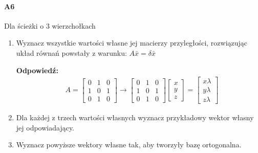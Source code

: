 \paragraph{A6} Dla ścieżki o $3$ wierzchołkach
\begin{enumerate}[label=\alph*)]
\item Wyznacz wszystkie wartości własne jej macierzy przyległości, rozwiązując układ równań powstały z warunku: $A\bar{x}=\delta \bar{x}$

\textbf{Odpowiedź: }\begin{align*}
& A=\begin{bmatrix}
0&1&0\\1&0&1\\0&1&0
\end{bmatrix}\rightarrow \begin{bmatrix}
0&1&0\\1&0&1\\0&1&0
\end{bmatrix} \begin{bmatrix}
x\\y\\z
\end{bmatrix} = \begin{bmatrix}
x\lambda \\y\lambda \\z\lambda 
\end{bmatrix}
\end{align*}

\item Dla każdej z trzech wartości własnych wyznacz przykładowy wektor własny jej odpowiadający.
\item Wyznacz powyższe wektory własne tak, aby tworzyły bazę ortogonalna. 
\end{enumerate}

